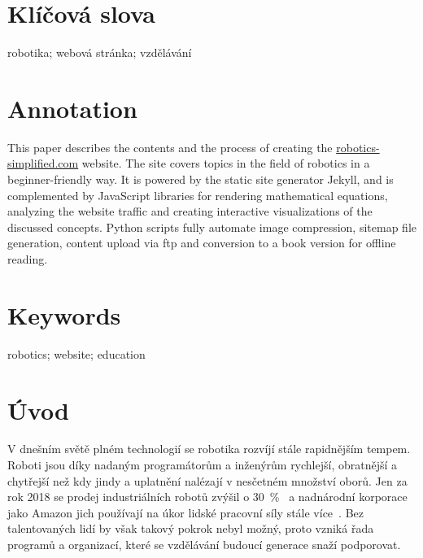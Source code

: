 \documentclass[a4paper, 12pt]{article}
\begin{document}
  \section*{\normalfont\textbf{Klíčová slova}}
  robotika; webová stránka; vzdělávání

  \section*{\normalfont\textbf{Annotation}}
  This paper describes the contents and the process of creating the \url{robotics-simplified.com} website. The site covers topics in the field of robotics in a beginner-friendly way. It is powered by the static site generator Jekyll, and is complemented by JavaScript libraries for rendering mathematical equations, analyzing the website traffic and creating interactive visualizations of the discussed concepts. Python scripts fully automate image compression, sitemap file generation, content upload via \acrshort{ftp} and conversion to a book version for offline reading.

  \section*{\normalfont\textbf{Keywords}}
  robotics; website; education

  \newpage

  \setcounter{savepage}{\value{page}}%


  \tableofcontents

  \newpage

  \printglossary[type=\acronymtype, title=Seznam zkratek]

  \newpage

  \section{Úvod}
  V dnešním světě plném technologií se robotika rozvíjí stále rapidnějším tempem. Roboti jsou díky nadaným programátorům a inženýrům rychlejší, obratnější a chytřejší než kdy jindy a uplatnění nalézají v nesčetném množství oborů. Jen za rok 2018 se prodej industriálních robotů zvýšil o \SI{30}{\percent}~\cite{industrial-robot-growth} a nadnárodní korporace jako Amazon jich používají na úkor lidské pracovní síly stále více~\cite{amazon-hiring}. Bez talentovaných lidí by však takový pokrok nebyl možný, proto vzniká řada programů a organizací, které se vzdělávání budoucí generace snaží podporovat.
\end{document}
